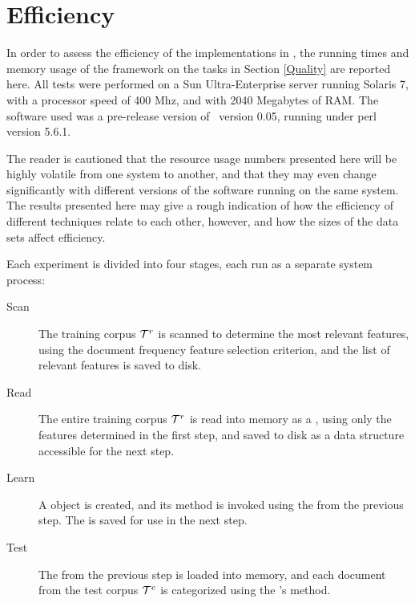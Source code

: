 \section{Efficiency}
\label{Efficiency}

In order to assess the efficiency of the implementations in \aicat,
the running times and memory usage of the framework on the tasks in
Section \ref{Quality} are reported here.  All tests were performed on
a Sun Ultra-Enterprise server running Solaris 7, with a processor
speed of 400 Mhz, and with 2040 Megabytes of RAM.  The software used
was a pre-release version of \aicat\ version 0.05, running under perl
version 5.6.1.

The reader is cautioned that the resource usage numbers presented here
will be highly volatile from one system to another, and that they may
even change significantly with different versions of the software
running on the same system.  The results presented here may give a
rough indication of how the efficiency of different techniques relate
to each other, however, and how the sizes of the data sets affect
efficiency.

Each experiment is divided into four stages, each run as a separate
system process:

\begin{description}
\item[Scan] The training corpus $\mathcal{T}^r$ is scanned to determine the
  most relevant features, using the document frequency feature
  selection criterion, and the list of relevant features is saved to
  disk.
\item[Read] The entire training corpus $\mathcal{T}^r$ is read into memory as
  a , using only the features determined in the
  first step, and saved to disk as a data structure accessible for the
  next step.
\item[Learn] A  object is created, and its
   method is invoked using the  from
  the previous step.  The  is saved for use in the next
  step.
\item[Test] The  from the previous step is loaded into
  memory, and each document from the test corpus $\mathcal{T}^e$ is
  categorized using the 's  method.
\end{description}


